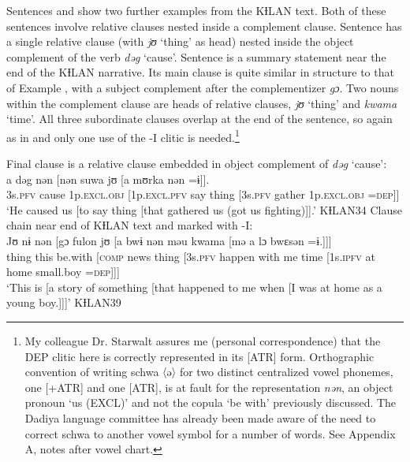 \documentclass[output=paper]{langscibook}
\begin{document}
\noindent Sentences  and  show two further examples from the KƗLAN text. Both of these sentences involve relative clauses nested inside a complement clause. Sentence  has a single relative clause (with \textit{jʊ} `thing' as head) nested inside the object complement of the verb \textit{dəg} `cause'. Sentence  is a summary statement near the end of the KƗLAN narrative. Its main clause is quite similar in structure to that of Example , with a subject complement after the complementizer \textit{gɔ}. Two nouns within the complement clause are heads of relative clauses, \textit{jʊ} `thing' and \textit{kwama} `time'. All three subordinate clauses overlap at the end of the sentence, so again as in  and  only one use of the -I clitic is needed.\footnote{My colleague Dr. Starwalt assures me (personal correspondence) that the DEP clitic here is correctly represented in its [\textminus ATR] form. Orthographic convention of writing schwa 〈ə〉 for two distinct centralized vowel phonemes, one [+ATR] and one [\textminus ATR], is at fault for the representation \textit{nən}, an object pronoun `us (EXCL)' and not the copula `be with' previously discussed. The Dadiya language committee has already been made aware of the need to correct schwa to another vowel symbol for a number of words. See Appendix A, notes after vowel chart.}

\ea Final clause is a relative clause embedded in object complement of \textit{dəg} `cause':
\label{ex:dettweiler:KƗLAN34} \\
\gll a dəg nən [nən suwa jʊ [a mʊrka nən =ɨ]]. \\
3s.\textsc{pfv} cause 1p.\textsc{excl}.\textsc{obj} [1p.\textsc{excl}.\textsc{pfv} say thing [3s.\textsc{pfv} gather 1p.\textsc{excl}.\textsc{obj} =\textsc{dep}]] \\
\glt `He caused us [to say thing [that gathered us (got us fighting)]].' KƗLAN34
\ex Clause chain near end of KƗLAN text and marked with -I:
\label{ex:dettweiler:KƗLAN39} \\
\gll Jʊ nɨ nən [gɔ fulon jʊ [a bwɨ nən məu kwama [mə a lɔ bwɛsən =ɨ.]]] \\
thing this be.with [\textsc{comp} news thing [3s.\textsc{pfv} happen with me time [1s.\textsc{ipfv} at home small.boy =\textsc{dep}]]] \\
\glt `This is [a story of something [that happened to me when [I was at home as a young boy.]]]' KƗLAN39
\z
\end{document}
